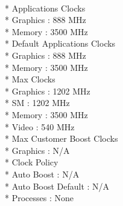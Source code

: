 \documentclass{article}
\begin{document}
  \\*   Applications Clocks
  \\*       Graphics                          : 888 MHz
  \\*       Memory                            : 3500 MHz
 \\*    Default Applications Clocks
   \\*      Graphics                          : 888 MHz
    \\*     Memory                            : 3500 MHz
   \\*  Max Clocks
  \\*       Graphics                          : 1202 MHz
  \\*       SM                                : 1202 MHz
   \\*      Memory                            : 3500 MHz
   \\*      Video                             : 540 MHz
  \\*   Max Customer Boost Clocks
  \\*       Graphics                          : N/A
  \\*   Clock Policy
    \\*     Auto Boost                        : N/A
    \\*     Auto Boost Default                : N/A
 \\*    Processes                             : None


       
       
\end{document}
